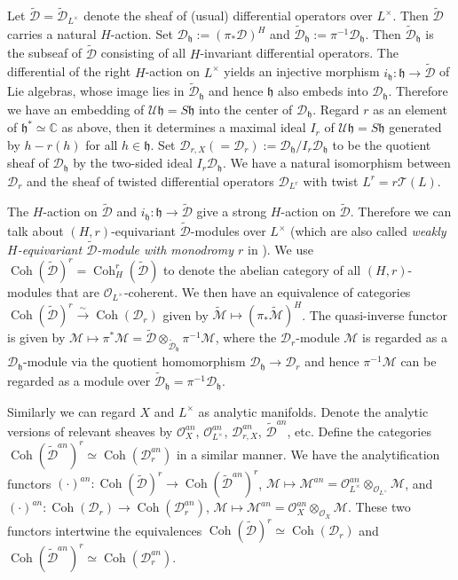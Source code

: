 \documentclass[12pt]{amsart}
\newcommand{\C}{\mathbb{C}}
\newcommand{\U}{\mathcal{U}}
\newcommand{\M}{\mathcal{M}}
\newcommand{\hf}{\mathfrak{h}}
\newcommand{\TT}{\mathscr{T}}
\newcommand{\OO}{\mathcal{O}}
\newcommand{\wt}{\widetilde}
\newcommand{\coh}{\operatorname{Coh}}
\theoremstyle{definition}
\numberwithin{equation}{section}
\begin{document}
Let $\wt{\mathscr{D}} = \wt{\mathscr{D}}_{L^\times}$ denote the sheaf of (usual) differential operators over $L^\times$. Then $\wt{\mathscr{D}}$ carries a natural $H$-action. Set $\mathscr{D}_\hf := (\pi_*\mathscr{D})^H$ and  $\wt{\mathscr{D}}_\hf := \pi^{-1} \mathscr{D}_\hf$. Then $\wt{\mathscr{D}}_\hf$ is the subseaf of $\wt{\mathscr{D}}$ consisting of all $H$-invariant differential operators. The differential of the right $H$-action on $L^\times$ yields an injective morphism $i_\hf: \hf \to \wt{\mathscr{D}}$ of Lie algebras, whose image lies in $\wt{\mathscr{D}}_\hf$ and hence $\hf$ also embeds into $\mathscr{D}_\hf$. Therefore we have an embedding of $\U\hf = S\hf$ into the center of $\mathscr{D}_\hf$. Regard $r$ as an element of $\hf^* \simeq \C$ as above, then it determines a maximal ideal $I_r$ of $\U\hf = S\hf$ generated by $h - r(h)$ for all $h \in \hf$.  Set $\mathscr{D}_{r,X} (= \mathscr{D}_r) := \mathscr{D}_\hf / I_r \mathscr{D}_\hf$ to be the quotient sheaf of $\mathscr{D}_\hf$ by the two-sided ideal $I_r \mathscr{D}_\hf$. We have a natural isomorphism between $\mathscr{D}_r$ and the sheaf of twisted differential operators $\mathscr{D}_{L^r}$ with twist $L^r = r \TT(L)$.

The $H$-action on $\wt{\mathscr{D}}$ and $i_\hf: \hf \to \wt{\mathscr{D}}$ give a strong $H$-action on $\wt{\mathscr{D}}$. Therefore we can talk about $(H, r)$-equivariant $\wt{\mathscr{D}}$-modules over $L^\times$ (which are also called {\it weakly $H$-equivariant $\wt{\mathscr{D}}$-module with monodromy $r$} in \cite[Section 2.5.2]{BB}). We use  $\coh(\wt{\mathscr{D}})^{r} = \coh_H^r(\wt{\mathscr{D}})$ to denote the abelian category of all $(H, r)$-modules that are $\OO_{L^\times}$-coherent. We then have an equivalence of categories $\coh(\wt{\mathscr{D}})^{r} \xrightarrow{\sim} \coh(\mathscr{D}_r)$ given by $\wt{\M} \mapsto (\pi_* \wt{\M})^H$. The quasi-inverse functor is given by $\M \mapsto \pi^* \M = \wt{\mathscr{D}} \otimes_{\wt{\mathscr{D}}_\hf } \pi^{-1}\M$, where the $\mathscr{D}_r$-module $\M$ is regarded as a $\mathscr{D}_\hf$-module via the quotient homomorphism $\mathscr{D}_\hf \to \mathscr{D}_r$ and hence $\pi^{-1} \M$ can be regarded as a module over $\wt{\mathscr{D}}_\hf = \pi^{-1} \mathscr{D}_\hf$.

Similarly we can regard $X$ and $L^\times$ as analytic manifolds. Denote the analytic versions of relevant sheaves by $\OO_X^{an}$, $\OO_{L^\times}^{an}$, $\mathscr{D}^{an}_{r,X}$, $\wt{\mathscr{D}}^{an}$, etc. Define the categories $\coh(\wt{\mathscr{D}}^{an})^{r} \simeq \coh(\mathscr{D}^{an}_r)$ in a similar manner. We have the analytification functors $(\cdot)^{an}:  \coh(\wt{\mathscr{D}})^{r}  \to \coh(\wt{\mathscr{D}}^{an})^{r}$, $\M \mapsto \M^{an} = \OO^{an}_{L^\times} \otimes_{\OO_{L^\times}} \M$, and $(\cdot)^{an}: \coh(\mathscr{D}_r) \to \coh(\mathscr{D}^{an}_r)$, $\M \mapsto \M^{an} = \OO^{an}_{X} \otimes_{\OO_{X}} \M$. These two functors intertwine the equivalences $\coh(\wt{\mathscr{D}})^{r} \simeq \coh(\mathscr{D}_r)$ and $\coh(\wt{\mathscr{D}}^{an})^{r} \simeq \coh(\mathscr{D}^{an}_r)$.
\end{document}

